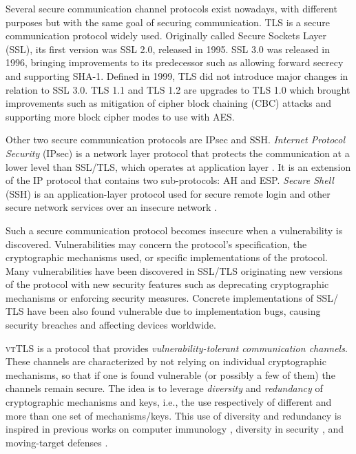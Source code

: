 \documentclass{sig-alternate-05-2015}
\begin{document}
Several secure communication channel protocols exist no\-wadays,  with different purposes but with the same goal of securing  communication.
%
TLS is a secure communication protocol widely used. Originally called Secure Sockets Layer (SSL), its first  version was SSL 2.0, released in 1995. SSL 3.0 was released in 1996, bringing improvements to its predecessor such as allowing forward secrecy and supporting SHA-1.
Defined in 1999, TLS did not introduce major changes in relation to SSL 3.0.
TLS 1.1 and TLS 1.2 are upgrades to TLS 1.0 which brought improvements such as mitigation of cipher block chaining (CBC) attacks and supporting more block cipher modes  to use with AES.

Other two secure communication protocols are IPsec and SSH.
\textit{Internet Protocol Security} (IPsec) is a network layer protocol that protects the communication at a lower level than SSL/TLS, which operates at application layer \cite{IPsec}. It is an extension of the IP protocol that contains two sub-protocols: AH and ESP.
%
\textit{Secure Shell} (SSH) is an application-layer protocol used for secure remote login and other secure network services over an insecure network \cite{SSH}.

Such a secure communication protocol becomes insecure when a vulnerability is discovered. Vulnerabilities may concern the protocol's specification, the cryptographic mechanisms used, or specific implementations of the protocol. Many vulnerabilities have been discovered in SSL/TLS originating new versions of the protocol with new security features such as deprecating cryptographic mechanisms or enforcing security measures.
Concrete implementations of SSL/ TLS have been also found vulnerable due to implementation bugs, causing  security breaches and affecting devices worldwide.

\textsc{vtTLS} is a protocol that provides \emph{vulnerability-tolerant communication channels}. These channels are characterized by not relying on individual cryptographic mechanisms, so that if one is found vulnerable (or possibly a few of them) the channels remain secure. The idea is to leverage  \textit{diversity}  and \textit{redundancy} of cryptographic mechanisms and keys, i.e., the use respectively of different and more than one set of mechanisms/keys. This use of diversity and redundancy is inspired in previous works on computer immunology \cite{Forrest1997}, diversity in security \cite{Littlewood2004,Garcia:11}, and moving-target defenses \cite{Carvalho2014}.
\end{document}
